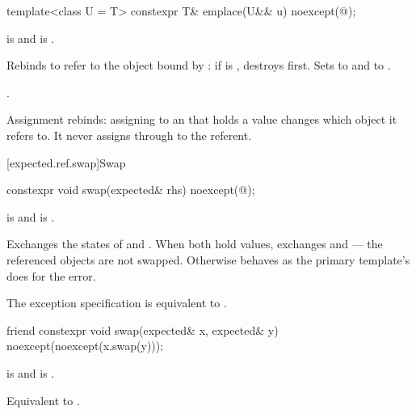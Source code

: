 %
\begin{itemdecl}
template<class U = T>
  constexpr T& emplace(U&& u) noexcept(@\seebelow@);
\end{itemdecl}

\begin{itemdescr}
\pnum
\constraints
{} is  and  is .

\pnum
\effects
Rebinds  to refer to the object bound by : if  is , destroys  first. Sets  to  and  to .

\pnum
\returns
{}.
\end{itemdescr}

\pnum
Assignment rebinds: assigning to an  that holds a value changes which object it refers to. It never assigns through to the referent.

[expected.ref.swap]{Swap}

%
\begin{itemdecl}
constexpr void swap(expected& rhs) noexcept(@\seebelow@);
\end{itemdecl}

\begin{itemdescr}
\pnum
\constraints
{} is  and  is .

\pnum
\effects
Exchanges the states of  and . When both hold values, exchanges  and  — the referenced objects are not swapped. Otherwise behaves as the primary template's  does for the error.

\pnum
\remarks
The exception specification is equivalent to .
\end{itemdescr}

%
\begin{itemdecl}
friend constexpr void swap(expected& x, expected& y) noexcept(noexcept(x.swap(y)));
\end{itemdecl}

\begin{itemdescr}
\pnum
\constraints
{} is  and  is .

\pnum
\effects
Equivalent to .
\end{itemdescr}

